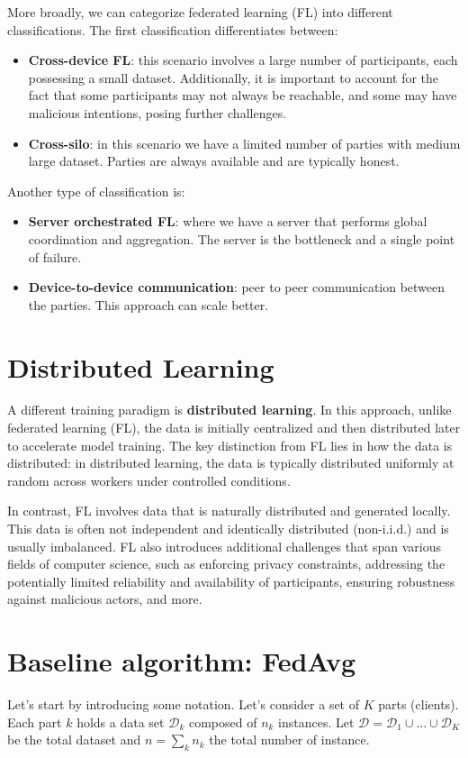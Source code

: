 More broadly, we can categorize federated learning (FL) into different
classifications. The first classification differentiates between:
\begin{itemize}
    \item \textbf{Cross-device FL}: this scenario involves a large number of
          participants, each possessing a small dataset. Additionally, it is
          important to account for the fact that some participants may not always
          be reachable, and some may have malicious intentions, posing further
          challenges.
    \item \textbf{Cross-silo}: in this scenario we have a limited number of parties
          with medium large dataset. Parties are always available and are
          typically honest.
\end{itemize}

Another type of classification is:
\begin{itemize}
    \item \textbf{Server orchestrated FL}: where we have a server that performs
          global coordination and aggregation. The server is the bottleneck and
          a single point of failure.
    \item \textbf{Device-to-device communication}: peer to peer communication
          between the parties. This approach can scale better.
\end{itemize}

\section{Distributed Learning}
A different training paradigm is \textbf{distributed learning}. In this approach,
unlike federated learning (FL), the data is initially centralized and then distributed
later to accelerate model training. The key distinction from FL lies in how the
data is distributed: in distributed learning, the data is typically distributed
uniformly at random across workers under controlled conditions.

In contrast, FL involves data that is naturally distributed and generated locally.
This data is often not independent and identically distributed (non-i.i.d.) and
is usually imbalanced. FL also introduces additional challenges that span various
fields of computer science, such as enforcing privacy constraints, addressing
the potentially limited reliability and availability of participants, ensuring
robustness against malicious actors, and more.
\section{Baseline algorithm: FedAvg}
Let's start by introducing some notation. Let's consider a set of $K$ parts
(clients). Each part $k$ holds a data set $\mathcal{D}_k$ composed of $n_k$
instances. Let $\mathcal{D} = \mathcal{D}_1 \cup \dots \cup \mathcal{D}_K$ be the
total dataset and $n = \sum_k n_k$ the total number of instance.

